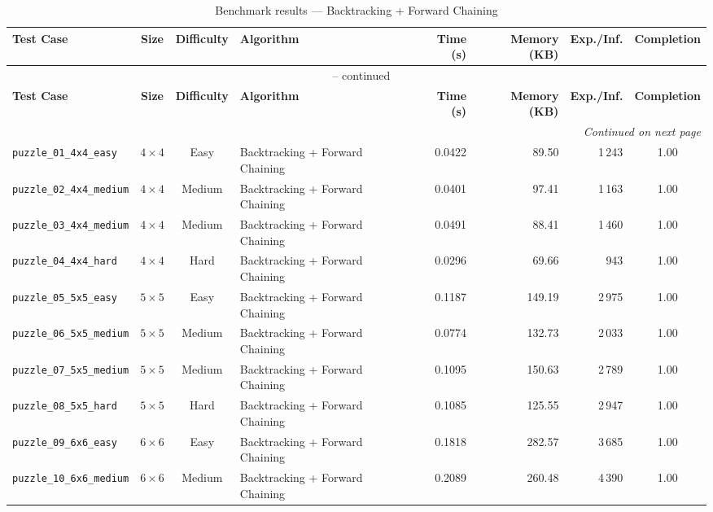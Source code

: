 \documentclass{article}
\begin{document}
\begin{longtable}{@{}lccl r r r c@{}}
  \caption{Benchmark results — Backtracking + Forward Chaining} \label{tab:backtracking___forward_chaining} \\
  \toprule
  \textbf{Test Case} & \textbf{Size} & \textbf{Difficulty} & \textbf{Algorithm} & \textbf{Time (s)} & \textbf{Memory (KB)} & \textbf{Exp./Inf.} & \textbf{Completion} \\
  \midrule
  \endfirsthead
  \multicolumn{8}{c}{\tablename\ \thetable{} -- continued} \\
  \toprule
  \textbf{Test Case} & \textbf{Size} & \textbf{Difficulty} & \textbf{Algorithm} & \textbf{Time (s)} & \textbf{Memory (KB)} & \textbf{Exp./Inf.} & \textbf{Completion} \\
  \midrule
  \endhead
  \midrule
  \multicolumn{8}{r}{\textit{Continued on next page}} \\
  \endfoot
  \bottomrule
  \endlastfoot
  \texttt{puzzle\_01\_4x4\_easy} & $4\times4$ & Easy & Backtracking + Forward Chaining & 0.0422 & 89.50 & 1\,243 & 1.00 \\
  \texttt{puzzle\_02\_4x4\_medium} & $4\times4$ & Medium & Backtracking + Forward Chaining & 0.0401 & 97.41 & 1\,163 & 1.00 \\
  \texttt{puzzle\_03\_4x4\_medium} & $4\times4$ & Medium & Backtracking + Forward Chaining & 0.0491 & 88.41 & 1\,460 & 1.00 \\
  \texttt{puzzle\_04\_4x4\_hard} & $4\times4$ & Hard & Backtracking + Forward Chaining & 0.0296 & 69.66 & 943 & 1.00 \\
  \texttt{puzzle\_05\_5x5\_easy} & $5\times5$ & Easy & Backtracking + Forward Chaining & 0.1187 & 149.19 & 2\,975 & 1.00 \\
  \texttt{puzzle\_06\_5x5\_medium} & $5\times5$ & Medium & Backtracking + Forward Chaining & 0.0774 & 132.73 & 2\,033 & 1.00 \\
  \texttt{puzzle\_07\_5x5\_medium} & $5\times5$ & Medium & Backtracking + Forward Chaining & 0.1095 & 150.63 & 2\,789 & 1.00 \\
  \texttt{puzzle\_08\_5x5\_hard} & $5\times5$ & Hard & Backtracking + Forward Chaining & 0.1085 & 125.55 & 2\,947 & 1.00 \\
  \texttt{puzzle\_09\_6x6\_easy} & $6\times6$ & Easy & Backtracking + Forward Chaining & 0.1818 & 282.57 & 3\,685 & 1.00 \\
  \texttt{puzzle\_10\_6x6\_medium} & $6\times6$ & Medium & Backtracking + Forward Chaining & 0.2089 & 260.48 & 4\,390 & 1.00 \\

\end{longtable}
\end{document}

